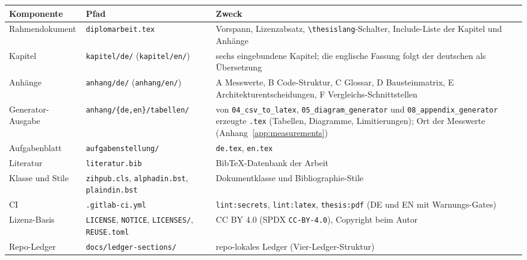 {\small
\begin{longtable}{@{}>{\raggedright\arraybackslash}p{}>{\raggedright\arraybackslash}p{}>{\raggedright\arraybackslash}p{}@{}}
\toprule
\textbf{Komponente} & \textbf{Pfad} & \textbf{Zweck} \\
\midrule
\endhead%
\midrule
\endfoot%
\bottomrule
\endlastfoot%
Rahmendokument &
\texttt{diplomarbeit.tex} &
Vorspann, Lizenzabsatz, \texttt{\textbackslash{}thesislang}-Schalter, Include-Liste der Kapitel und
Anhänge \\
Kapitel &
\texttt{kapitel/\allowbreak{}de/} (\texttt{kapitel/\allowbreak{}en/}) &
sechs eingebundene Kapitel; die englische Fassung folgt der deutschen als Übersetzung \\
Anhänge &
\texttt{anhang/\allowbreak{}de/} (\texttt{anhang/\allowbreak{}en/}) &
A Messwerte, B Code-Struktur, C Glossar, D Bausteinmatrix, E Architekturentscheidungen,
F Vergleichs-Schnittstellen \\
Generator-Ausgabe &
\texttt{anhang/\allowbreak{}\{de,en\}/\allowbreak{}tabellen/} &
von \texttt{04\_\allowbreak{}csv\_\allowbreak{}to\_\allowbreak{}latex}, \texttt{05\_\allowbreak{}diagram\_\allowbreak{}generator} und
\texttt{08\_\allowbreak{}appendix\_\allowbreak{}generator} erzeugte \texttt{.tex} (Tabellen, Diagramme,
Limitierungen); Ort der Messwerte (Anhang~\ref{app:measurements}) \\
Aufgabenblatt &
\texttt{aufgabenstellung/} &
\texttt{de.tex}, \texttt{en.tex} \\
Literatur &
\texttt{literatur.bib} &
BibTeX-Datenbank der Arbeit \\
Klasse und Stile &
\texttt{zihpub.cls}, \texttt{alphadin.bst}, \texttt{plaindin.bst} &
Dokumentklasse und Bibliographie-Stile \\
CI &
\texttt{.gitlab-ci.yml} &
\texttt{lint:secrets}, \texttt{lint:latex}, \texttt{thesis:pdf} (DE und EN mit Warnungs-Gates) \\
Lizenz-Basis &
\texttt{LICENSE}, \texttt{NOTICE}, \texttt{LICENSES/}, \texttt{REUSE.toml} &
CC BY 4.0 (SPDX \texttt{CC-BY-4.0}), Copyright beim Autor \\
Repo-Ledger &
\texttt{docs/\allowbreak{}ledger-sections/} &
repo-lokales Ledger (Vier-Ledger-Struktur) \\
\end{longtable}
}
